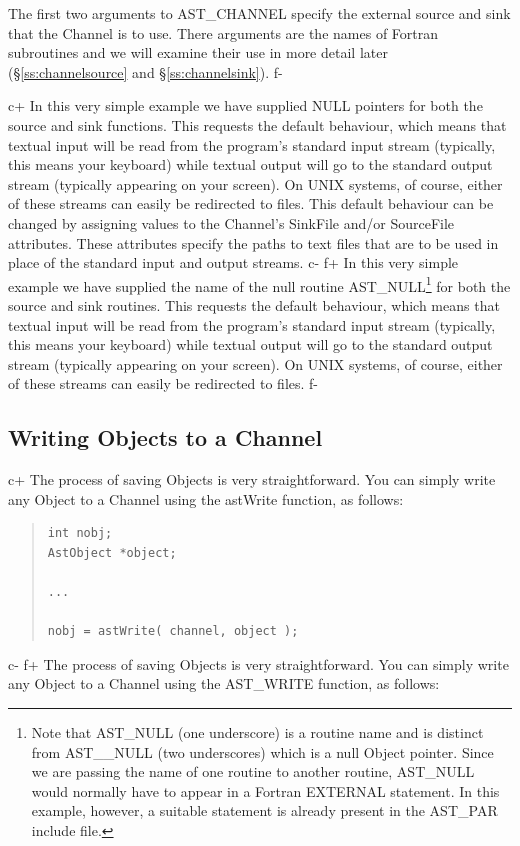 \documentclass[twoside,11pt]{article}
\newcommand{\secref}[1]{\S\ref{#1}}
\newcommand{\secref}[1]{\ref{#1}}
\begin{document}
The first two arguments to AST\_CHANNEL specify the external source
and sink that the Channel is to use. There arguments are the names of
Fortran subroutines and we will examine their use in more detail later
(\secref{ss:channelsource} and \secref{ss:channelsink}).
f-

c+
In this very simple example we have supplied NULL pointers for both
the source and sink functions. This requests the default behaviour,
which means that textual input will be read from the program's
standard input stream (typically, this means your keyboard) while
textual output will go to the standard output stream (typically
appearing on your screen). On UNIX systems, of course, either of these
streams can easily be redirected to files. This default behaviour can be
changed by assigning values to the Channel's SinkFile and/or SourceFile
attributes. These attributes specify the paths to text files that are to
be used in place of the standard input and output streams.
c-
f+
In this very simple example we have supplied the name of the null
routine AST\_NULL\footnote{Note that AST\_NULL (one underscore) is a
routine name and is distinct from AST\_\_NULL (two underscores) which
is a null Object pointer.  Since we are passing the name of one
routine to another routine, AST\_NULL would normally have to appear in
a Fortran EXTERNAL statement. In this example, however, a suitable
statement is already present in the AST\_PAR include file.} for both
the source and sink routines.  This requests the default behaviour,
which means that textual input will be read from the program's
standard input stream (typically, this means your keyboard) while
textual output will go to the standard output stream (typically
appearing on your screen). On UNIX systems, of course, either of these
streams can easily be redirected to files.
f-

\subsection{\label{ss:writingtoachannel}Writing Objects to a Channel}

c+
The process of saving Objects is very straightforward. You can
simply write any Object to a Channel using the astWrite
function, as follows:

\begin{quote}
\small
\begin{verbatim}
int nobj;
AstObject *object;

...

nobj = astWrite( channel, object );
\end{verbatim}
\normalsize
\end{quote}
c-
f+
The process of saving Objects is very straightforward. You can
simply write any Object to a Channel using the AST\_WRITE
function, as follows:
\end{document}
